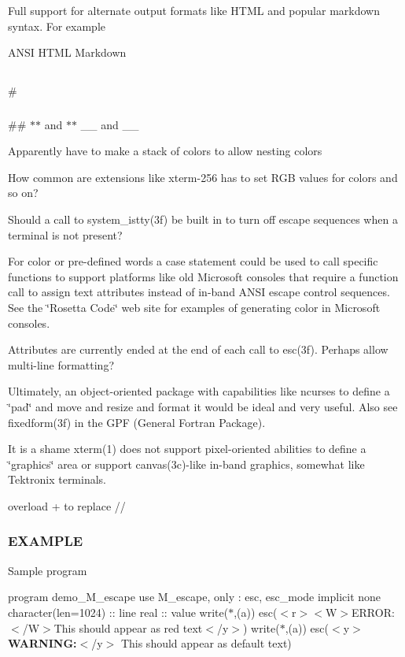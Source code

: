 Full support for alternate output formats like H\+T\+ML and popular markdown syntax. For example

A\+N\+SI H\+T\+ML Markdown \subsection*{}

\# \subsubsection*{}

\#\# {\bfseries } $\ast$$\ast$ and $\ast$$\ast$ {\itshape } \+\_\+\+\_\+ and \+\_\+\+\_\+

Apparently have to make a stack of colors to allow nesting colors

How common are extensions like xterm-\/256 has to set R\+GB values for colors and so on?

Should a call to system\+\_\+istty(3f) be built in to turn off escape sequences when a terminal is not present?

For color or pre-\/defined words a case statement could be used to call specific functions to support platforms like old Microsoft consoles that require a function call to assign text attributes instead of in-\/band A\+N\+SI escape control sequences. See the \char`\"{}\+Rosetta Code\char`\"{} web site for examples of generating color in Microsoft consoles.

Attributes are currently ended at the end of each call to esc(3f). Perhaps allow multi-\/line formatting?

Ultimately, an object-\/oriented package with capabilities like ncurses to define a \char`\"{}pad\char`\"{} and move and resize and format it would be ideal and very useful. Also see fixedform(3f) in the G\+PF (General Fortran Package).

It is a shame xterm(1) does not support pixel-\/oriented abilities to define a \char`\"{}graphics\char`\"{} area or support canvas(3c)-\/like in-\/band graphics, somewhat like Tektronix terminals.

overload + to replace //

\subsubsection*{E\+X\+A\+M\+P\+LE}

Sample program

program demo\+\_\+\+M\+\_\+escape use M\+\_\+escape, only \+: esc, esc\+\_\+mode implicit none character(len=1024) \+:\+: line real \+:\+: value write($\ast$,\textquotesingle{}(a)\textquotesingle{}) esc(\textquotesingle{}$<$r$>$$<$\+W$>$E\+R\+R\+OR\+:$<$/\+W$>$This should appear as red text$<$/y$>$\textquotesingle{}) write($\ast$,\textquotesingle{}(a)\textquotesingle{}) esc(\textquotesingle{}$<$y$>${\bfseries W\+A\+R\+N\+I\+NG\+:}$<$/y$>$ This should appear as default text\textquotesingle{})

